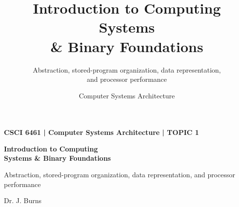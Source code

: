 \documentclass[aspectratio=169,11pt,t]{beamer}
\title[Topic 1]{Introduction to Computing Systems\\\& Binary Foundations}
\subtitle{
  Abstraction, stored-program organization, data representation,\\
  and processor performance
}
\author{Computer Systems Architecture}
\date{}
\begin{document}

\begin{frame}[plain]

\vspace*{\fill}

\begin{minipage}{0.88\textwidth}
{\color{gold}\normalsize\bfseries
CSCI 6461 \;|\; Computer Systems Architecture \;|\; TOPIC 1
\par}

\vspace{0.25cm}

{\color{white}\fontsize{24}{28}\selectfont\bfseries
Introduction to Computing \\ Systems
\& Binary Foundations
\par}

\vspace{0.35cm}

{\color{white!80}\large
Abstraction, stored-program organization, data representation, and processor performance
\par}
\end{minipage}

\vfill

{\color{white!70}\small
Dr. J. Burns
\par}

\vspace*{\fill}
\end{frame}





\end{document}
